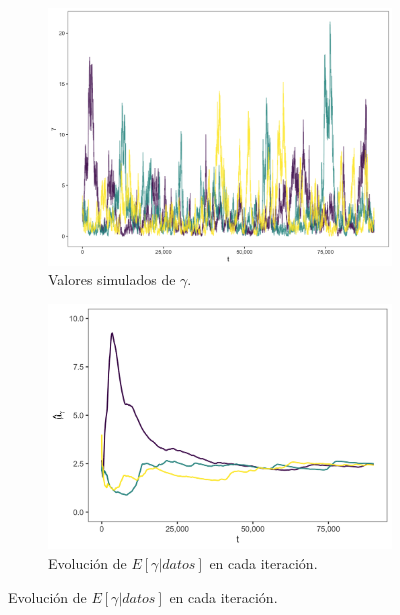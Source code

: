 \documentclass[11pt,a4paper]{article}
\begin{document}
\begin{figure}[!htb]
    \centering
    \begin{subfigure}[t]{0.45\textwidth}
       \centering\includegraphics[width=\linewidth]{gamma_traceplot.png}
       \caption{Valores simulados de $\gamma$.}
       \label{fig:gamma_trace}
    \end{subfigure}
    \hfill
    \begin{subfigure}[t]{0.45\textwidth}
      \centering\includegraphics[width=\linewidth]{gamma_ergodic_means.png}
      \caption{Evolución de $E \left[ \gamma | datos \right]$ en cada iteración.}
      \label{fig:gamma_means}
    \end{subfigure}


\end{figure}
\end{document}
